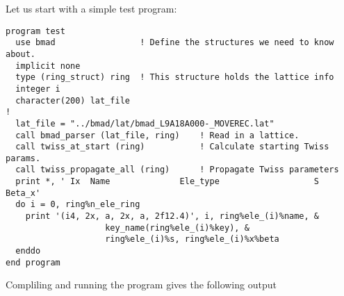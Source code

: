 Let us start with a simple test program:
\begin{verbatim}
program test
  use bmad                 ! Define the structures we need to know about.
  implicit none
  type (ring_struct) ring  ! This structure holds the lattice info
  integer i
  character(200) lat_file
!
  lat_file = "../bmad/lat/bmad_L9A18A000-_MOVEREC.lat"
  call bmad_parser (lat_file, ring)    ! Read in a lattice.
  call twiss_at_start (ring)           ! Calculate starting Twiss params.
  call twiss_propagate_all (ring)      ! Propagate Twiss parameters
  print *, ' Ix  Name              Ele_type                   S      Beta_x'
  do i = 0, ring%n_ele_ring
    print '(i4, 2x, a, 2x, a, 2f12.4)', i, ring%ele_(i)%name, &
                    key_name(ring%ele_(i)%key), &
                    ring%ele_(i)%s, ring%ele_(i)%x%beta
  enddo
end program
\end{verbatim}

Compliling and running the program gives the following output
\begin{verbatim}

\end{verbatim}

